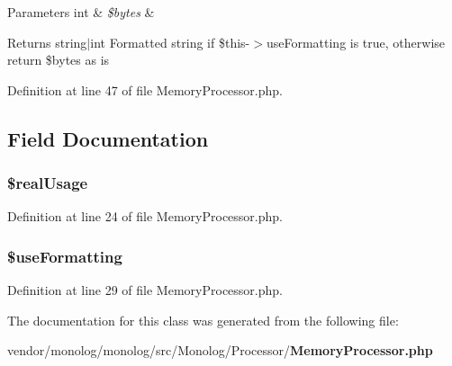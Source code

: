 \begin{DoxyParams}[1]{Parameters}
int & {\em \$bytes} & \\
\hline
\end{DoxyParams}
\begin{DoxyReturn}{Returns}
string$\vert$int Formatted string if \$this-\/$>$use\+Formatting is true, otherwise return \$bytes as is 
\end{DoxyReturn}


Definition at line 47 of file Memory\+Processor.\+php.



\subsection{Field Documentation}
\subsubsection[{\$real\+Usage}]{\setlength{\rightskip}{0pt plus 5cm}\$real\+Usage\hspace{0.3cm}{\ttfamily [protected]}}\label{class_monolog_1_1_processor_1_1_memory_processor_a5e4c9a932fbf5607664af102bcff06f5}


Definition at line 24 of file Memory\+Processor.\+php.

\subsubsection[{\$use\+Formatting}]{\setlength{\rightskip}{0pt plus 5cm}\$use\+Formatting\hspace{0.3cm}{\ttfamily [protected]}}\label{class_monolog_1_1_processor_1_1_memory_processor_a4c062bf66528cc701fcbc07a7b823f5a}


Definition at line 29 of file Memory\+Processor.\+php.



The documentation for this class was generated from the following file\+:\begin{DoxyCompactItemize}
\item 
vendor/monolog/monolog/src/\+Monolog/\+Processor/{\bf Memory\+Processor.\+php}\end{DoxyCompactItemize}
